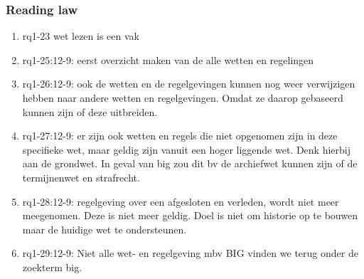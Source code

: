 \subsubsection{Reading law}
\begin{comment}
Hoort dit niet bij rq3?
plaats hier de afgehandelde items.
\end{comment}
\begin{enumerate}
    \item rq1-23 wet lezen is een vak 
    \item rq1-25:12-9: eerst overzicht maken van de alle wetten en regelingen
    \item rq1-26:12-9: ook de wetten en de regelgevingen kunnen nog weer verwijzigen hebben naar andere wetten en regelgevingen. Omdat ze daarop gebaseerd kunnen zijn of deze uitbreiden.
    \item rq1-27:12-9: er zijn ook wetten en regels die niet opgenomen zijn in deze specifieke wet, maar geldig zijn vanuit een hoger liggende wet. 
    Denk hierbij aan de grondwet. 
    In geval van big zou dit bv de archiefwet kunnen zijn of de termijnenwet en strafrecht.
    \item rq1-28:12-9: regelgeving over een afgesloten en verleden, wordt niet meer meegenomen. 
    Deze is niet meer geldig. 
    Doel is niet om historie op te bouwen maar de huidige wet te ondersteunen.
    \item rq1-29:12-9: Niet alle wet- en regelgeving mbv BIG vinden we terug onder de zoekterm big.
\end{enumerate}

